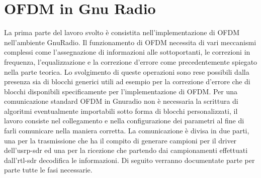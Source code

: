 \chapter{OFDM in Gnu Radio}
\label{cha:789}
La prima parte del lavoro svolto è consistita nell'implementazione di OFDM nell'ambiente GnuRadio. Il funzionamento di OFDM necessita di vari meccanismi complessi come l'assegnazione di informazioni alle sottoportanti, le correzioni in frequenza, l'equalizzazione e la correzione d'errore come precedentemente spiegato nella parte teorica. Lo svolgimento di queste operazioni sono rese possibili dalla presenza sia di blocchi generici utili ad esempio per la correzione d'errore che di blocchi disponibili specificamente per l'implementazione di OFDM. Per una comunicazione standard OFDM in Gnuradio non è necessaria la scrittura di algoritmi eventualmente importabili sotto forma di blocchi personalizzati, il lavoro consiste nel collegamento e nella configurazione dei parametri al fine di farli comunicare nella maniera corretta.
La comunicazione è divisa in due parti, una per la trasmissione che ha il compito di generare campioni per il driver dell'usrp-sdr ed una per la ricezione che partendo dai campionamenti effettuati dall'rtl-sdr decodifica le informazioni. Di seguito verranno documentate parte per parte tutte le fasi necessarie.

